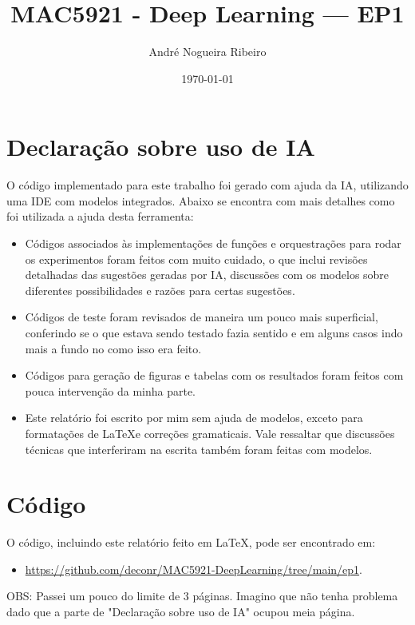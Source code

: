 \documentclass[11pt,a4paper]{article}
\title{MAC5921 - Deep Learning — EP1}
\author{André Nogueira Ribeiro}
\date{\today}
\begin{document}
\maketitle

\section{Declaração sobre uso de IA}

O código implementado para este trabalho foi gerado com ajuda da IA, utilizando uma IDE com modelos integrados. Abaixo se encontra com mais detalhes como foi utilizada a ajuda desta ferramenta:

\begin{itemize}
\item Códigos associados às implementações de funções e orquestrações para rodar os experimentos foram feitos com muito cuidado, o que inclui revisões detalhadas das sugestões geradas por IA, discussões com os modelos sobre diferentes possibilidades e razões para certas sugestões.
\item Códigos de teste foram revisados de maneira um pouco mais superficial, conferindo se o que estava sendo testado fazia sentido e em alguns casos indo mais a fundo no como isso era feito.
\item Códigos para geração de figuras e tabelas com os resultados foram feitos com pouca intervenção da minha parte.
\item Este relatório foi escrito por mim sem ajuda de modelos, exceto para formatações de \LaTeX e correções gramaticais. Vale ressaltar que discussões técnicas que interferiram na escrita também foram feitas com modelos.
\end{itemize}

\section{Código}

O código, incluindo este relatório feito em \LaTeX, pode ser encontrado em:
\begin{itemize}
\item \href{https://github.com/deconr/MAC5921-DeepLearning/tree/main/ep1}{https://github.com/deconr/MAC5921-DeepLearning/tree/main/ep1}.
\end{itemize}

OBS: Passei um pouco do limite de 3 páginas. Imagino que não tenha problema dado que a parte de "Declaração sobre uso de IA" ocupou meia página.
\end{document}

